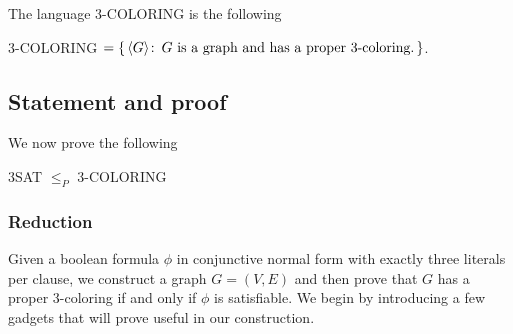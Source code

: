 The language 3-COLORING is the following
\begin{definition}
  3-COLORING $= \{\, \langle G \rangle \colon\, \text{$G$ is a graph and has
  a proper 3-coloring.}\,\}$.
\end{definition}

\subsection{Statement and proof}

We now prove the following
\begin{theorem}
	3SAT $\le_P$ 3-COLORING
\end{theorem}

\subsubsection{Reduction}

Given a boolean formula $\phi$ in conjunctive normal form with exactly three
literals per clause, we construct a graph $G = (V,E)$ and then prove that $G$
has a proper 3-coloring if and only if $\phi$ is satisfiable. We begin by
introducing a few gadgets that will prove useful in our construction.

